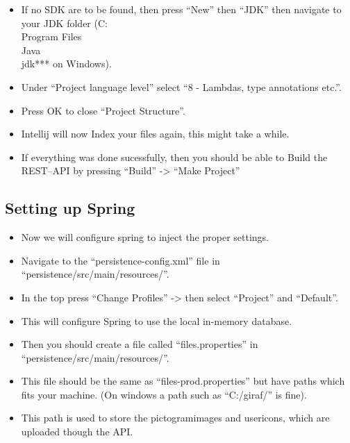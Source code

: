 \begin{itemize}
    \item If no SDK are to be found, then press ``New'' then ``JDK'' then navigate to your JDK folder (C:\\Program Files\\Java\\jdk*** on Windows).
    \item Under ``Project language level'' select ``8 - Lambdas, type annotations etc.''.
    \item Press OK to close ``Project Structure''.
    \item Intellij will now Index your files again, this might take a while.
    \item If everything was done sucessfully, then you should be able to Build the REST--API by pressing ``Build'' -> ``Make Project''
\end{itemize}

\subsection*{Setting up Spring}
\begin{itemize}
    \item Now we will configure spring to inject the proper settings.
    \item Navigate to the ``persistence-config.xml'' file in ``persistence/src/main/resources/''.
    \item In the top press ``Change Profiles'' -> then select ``Project'' and ``Default''.
    \item This will configure Spring to use the local in-memory database.
    \item Then you should create a file called ``files.properties'' in ``persistence/src/main/resources/''.
    \item This file should be the same as ``files-prod.properties'' but have paths which fits your machine. (On windows a path such as ``C:/giraf/''
is fine).
    \item This path is used to store the pictogramimages and usericons, which are uploaded though the API.
\end{itemize}


